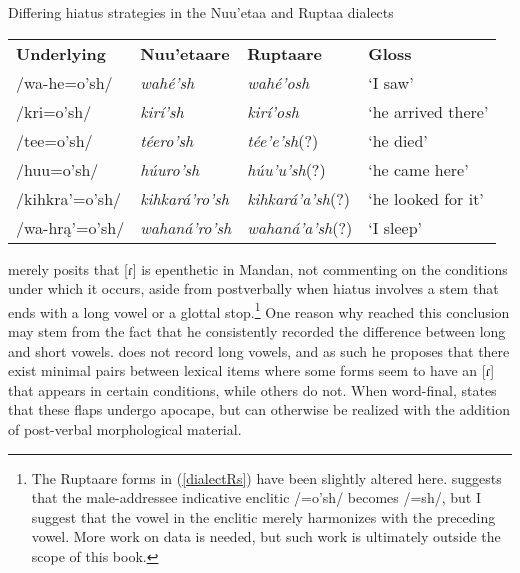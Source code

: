 \begin{exe}
\item\label{dialectRs} Differing hiatus strategies in the Nuu'etaa and Ruptaa dialects

\begin{tabular}{llll}
\textbf{Underlying}&
	\textbf{Nuu'etaare}&
	\textbf{Ruptaare}&
	\textbf{Gloss}\\
/wa-he=o'sh/&
	\textit{wahé'sh}&
	\textit{wahé'osh}&
	`I saw'\\
/kri=o'sh/&
	\textit{kirí'sh}&
	\textit{kirí'osh}&
	`he arrived there'\\
/tee=o'sh/&
	\textit{téero'sh}&
	\textit{tée'e'sh}(?)&
	`he died'\\
/huu=o'sh/&
	\textit{húuro'sh}&
	\textit{húu'u'sh}(?)&
	`he came here'\\
/kihkra'=o'sh/&
	\textit{kihkará'ro'sh}&
	\textit{kihkará'a'sh}(?)&
	`he looked for it'\\
/wa-hrą'=o'sh/&
	\textit{wahaná'ro'sh}&
	\textit{wahaná'a'sh}(?)&
	`I sleep'\\


\end{tabular}

\end{exe}

\citet[487]{carter1991a} merely posits that [ɾ] is epenthetic in Mandan, not commenting on the conditions under which it occurs, aside from postverbally when hiatus involves a stem that ends with a long vowel or a glottal stop.\footnote{The Ruptaare forms in (\ref{dialectRs}) have been slightly altered here. \citet{carter1991a} suggests that the male-addressee indicative enclitic /=o'sh/ becomes /=sh/, but I suggest that the vowel in the enclitic merely harmonizes with the preceding vowel. More work on  data is needed, but such work is ultimately outside the scope of this book.} One reason why \citeauthor{carter1991a} reached this conclusion may stem from the fact that he consistently recorded the difference between long and short vowels. \citeauthor{hollow1970} does not record long vowels, and as such he proposes that there exist minimal pairs between lexical items where some forms seem to have an [ɾ] that appears in certain conditions, while others do not. When word-final, \citeauthor{hollow1970} states that these flaps undergo apocape, but can otherwise be realized with the addition of post-verbal morphological material.

